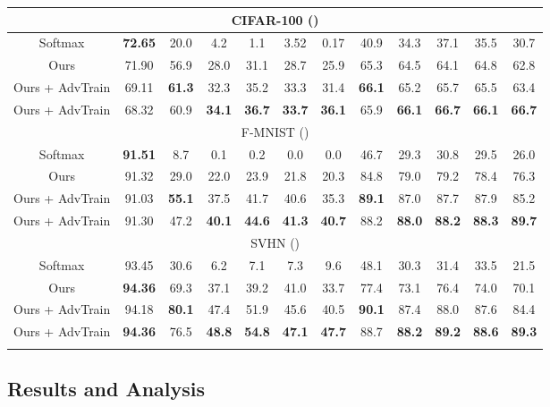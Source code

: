 \documentclass[10pt,twocolumn,letterpaper]{article}
\begin{document}
\begin{table*}[htp]
\begin{center}
{\begin{tabular}{cc|ccccc|ccccc}
\multicolumn{12}{c}{CIFAR-100 ()} \\
\hline
Softmax & \textbf{72.65} &  20.0 & 4.2 & 1.1 & 3.52& 0.17 &  40.9 & 34.3 & 37.1 & 35.5& 30.7\\
Ours & 71.90 & 56.9 & 28.0& 31.1 & 28.7 & 25.9 & 65.3 & 64.5 & 64.1 & 64.8 & 62.8 \\
Ours + AdvTrain & 69.11& \textbf{61.3} & 32.3 & 35.2 & 33.3 & 31.4 & \textbf{66.1} & 65.2 & 65.7  & 65.5  & 63.4\\
Ours + AdvTrain & 68.32 & 60.9 & \textbf{34.1} & \textbf{36.7}& \textbf{33.7} & \textbf{36.1} & 65.9 & \textbf{66.1} & \textbf{66.7} & \textbf{66.1}& \textbf{66.7}\\
\hline \hline

\multicolumn{12}{c}{F-MNIST ()} \\
\hline
Softmax & \textbf{91.51} & 8.7 & 0.1 & 0.2 & 0.0 & 0.0 & 46.7 & 29.3 & 30.8 & 29.5 & 26.0\\
Ours & 91.32 & 29.0 & 22.0 & 23.9 & 21.8 & 20.3 & 84.8 & 79.0 & 79.2 & 78.4 & 76.3\\
Ours + AdvTrain & 91.03 & \textbf{55.1} & 37.5 & 41.7 & 40.6 & 35.3 & \textbf{89.1} & 87.0 & 87.7 & 87.9 & 85.2\\
Ours + AdvTrain & 91.30 & 47.2 & \textbf{40.1} & \textbf{44.6} & \textbf{41.3}& \textbf{40.7} & 88.2 & \textbf{88.0} & \textbf{88.2} & \textbf{88.3}& \textbf{89.7}\\
\hline \hline

\multicolumn{12}{c}{SVHN ()} \\
\hline
Softmax & 93.45 & 30.6 & 6.2 & 7.1 & 7.3 & 9.6 & 48.1 & 30.3 & 31.4 & 33.5 & 21.5\\
Ours & \textbf{94.36} & 69.3 & 37.1 & 39.2 & 41.0 & 33.7 & 77.4 & 73.1 & 76.4 & 74.0 & 70.1\\
Ours + AdvTrain & 94.18 & \textbf{80.1} & 47.4 & 51.9 & 45.6 & 40.5 & \textbf{90.1} & 87.4 & 88.0 & 87.6 & 84.4\\
Ours + AdvTrain & \textbf{94.36} & 76.5 & \textbf{48.8} & \textbf{54.8} & \textbf{47.1} & \textbf{47.7} & 88.7 & \textbf{88.2} & \textbf{89.2} & \textbf{88.6} & \textbf{89.3}\\
\hline \hline
\vspace{-2em}
\end{tabular} 
}
\end{center}
\vspace{-1em}
\end{table*}

\subsection{Results and Analysis}
\end{document}
